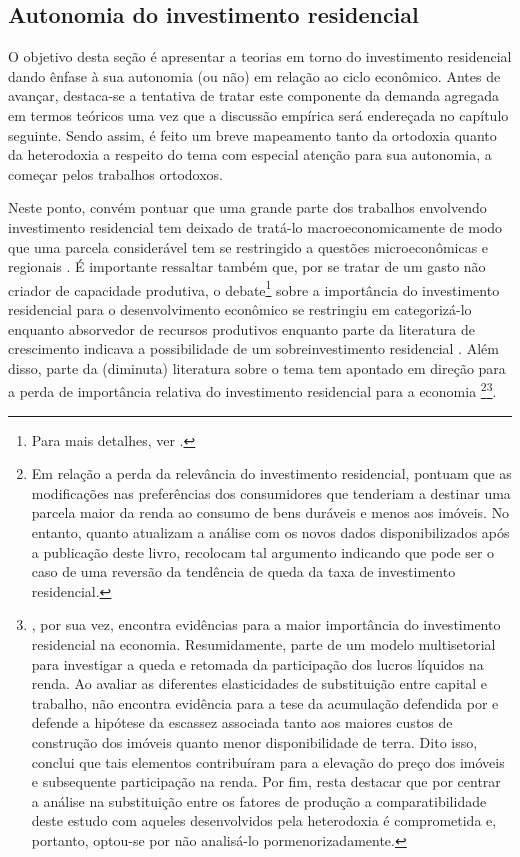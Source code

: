 \subsection{Autonomia do investimento residencial}
\label{RevResidencial}

O objetivo desta seção é apresentar a teorias em torno do investimento residencial dando ênfase à sua autonomia (ou não) em relação ao ciclo econômico. Antes de avançar, destaca-se a tentativa de tratar este componente da demanda agregada em termos teóricos uma vez que a discussão empírica será endereçada no capítulo seguinte. 
Sendo assim, é feito um breve mapeamento tanto da ortodoxia quanto da heterodoxia a respeito do tema com especial atenção para sua autonomia, a começar pelos trabalhos ortodoxos.

Neste ponto, convém pontuar que uma grande parte dos trabalhos envolvendo investimento residencial tem deixado de tratá-lo macroeconomicamente de modo que uma parcela considerável tem se restringido a questões microeconômicas e regionais \cite{arestis_u.s._2008}.
É importante ressaltar também que, por se tratar de um gasto não criador de capacidade produtiva, o debate\footnote{Para mais detalhes, ver \textcite{arku_housing_2006}.} sobre a importância do investimento residencial para o desenvolvimento econômico se restringiu em categorizá-lo enquanto absorvedor de recursos produtivos \cite{solow_importance_1995} enquanto parte da literatura de crescimento indicava  a possibilidade de um sobreinvestimento residencial \cite{mills_has_1987}.
Além disso, parte da (diminuta) literatura sobre o tema tem apontado em direção para a perda de importância relativa do investimento residencial para a economia \cite{grebler_capital_1956}\footnote{
	Em relação a perda da relevância do investimento residencial, \textcite[p.~134-142]{grebler_capital_1956} pontuam que as modificações nas preferências dos consumidores que tenderiam a destinar uma parcela maior da renda ao consumo de bens duráveis e menos aos imóveis. No entanto, quanto atualizam a análise com os novos dados disponibilizados após a publicação deste livro, recolocam tal argumento indicando que pode ser o caso de uma reversão da tendência de queda da taxa de investimento residencial.
}\footnote{
	\textcite{rognlie_deciphering_2016}, por sua vez, encontra evidências para a maior importância do investimento residencial na economia.
	Resumidamente, parte de um modelo multisetorial para investigar a queda e retomada da participação dos lucros líquidos na renda.
	Ao avaliar as diferentes elasticidades de substituição entre capital e trabalho, não encontra evidência para a tese da acumulação defendida por \textcite{piketty_o_2014} e defende a hipótese da escassez associada tanto aos maiores custos de construção dos imóveis quanto menor disponibilidade de terra.
	Dito isso, conclui que tais elementos contribuíram para a elevação do preço dos imóveis e subsequente participação na renda.
	Por fim, resta destacar que por centrar a análise na substituição entre os fatores de produção a comparatibilidade deste estudo com aqueles desenvolvidos pela heterodoxia é comprometida e, portanto, optou-se por não analisá-lo pormenorizadamente.
}.

